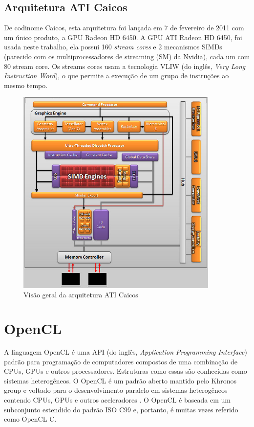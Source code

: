 \subsection{Arquitetura ATI Caicos}
De codinome Caicos, esta arquitetura foi lançada em 7 de fevereiro de 2011 com um único produto, a GPU Radeon HD 6450.
A GPU ATI Radeon HD 6450, foi usada neste trabalho, ela possui 160 \textit{stream cores} e 2 mecanismos SIMDs (parecido com os multiprocessadores de streaming (SM) da Nvidia), cada um com 80 stream core. Os streams cores usam a tecnologia VLIW (do inglês, \textit{Very Long Instruction Word}), o que permite a execução de um grupo de instruções ao mesmo tempo.
\FloatBarrier
\begin{figure}[!ht]
\centering
\includegraphics[width=10cm]{caicos.jpg}
\caption{Visão geral da arquitetura ATI Caicos}
\label{fig:caicos}
\end{figure}
\FloatBarrier
\section{OpenCL}
A linguagem OpenCL é uma API (do inglês, \textit{Application Programming  Interface})  padrão  para  programação  de  computadores  compostos  de  uma  combinação  de  CPUs,  GPUs e  outros processadores. Estruturas como essas são conhecidas como sistemas  heterogêneos. O OpenCL é um padrão aberto mantido pelo Khronos group e voltado para o desenvolvimento paralelo em sistemas heterogêneos contendo CPUs, GPUs e outros aceleradores \cite{opencl08}. O OpenCL é baseada em um subconjunto estendido do padrão ISO C99 e, portanto, é muitas vezes referido como  OpenCL C. 

